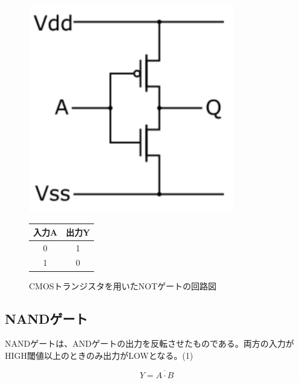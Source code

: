 \documentclass{jlreq}
\numberwithin{equation}{section}
\begin{document}
\begin{figure}[H]
  \centering
  \begin{minipage}{0.45\textwidth}
    \centering
    \includegraphics[width=0.8\textwidth]{assets/not.png}
    \caption{CMOSトランジスタを用いたNOTゲートの回路図}
    \label{fig:not_gate}
  \end{minipage}
  \hfill
  \begin{minipage}{0.45\textwidth}
    \centering
    \label{tab:not_truth_table}
    \begin{tabular}{|c|c|}
      \hline
      入力A & 出力Y \\ \hline
      0     & 1     \\ \hline
      1     & 0     \\ \hline
    \end{tabular}
  \end{minipage}
\end{figure}

\subsection{NANDゲート}
NANDゲートは、ANDゲートの出力を反転させたものである。両方の入力がHIGH閾値以上のときのみ出力がLOWとなる。(1)

\begin{equation}
  Y = \overline{A \cdot B}
\end{equation}
\end{document}
